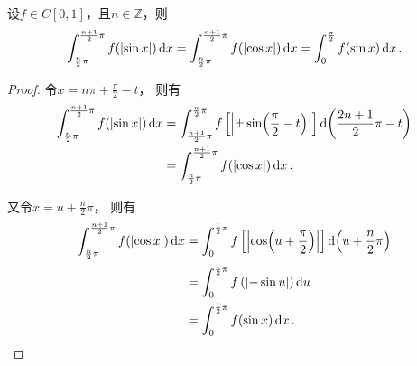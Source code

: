 \begin{proposition}\label{theorem:定积分.正余弦函数的复合的积分2}
设\(f \in C[0,1]\)，且\(n\in\mathbb{Z}\)，则\begin{equation}
	\int_{\frac{n}{2} \pi}^{\frac{n+1}{2} \pi} f(\abs{\sin x}) \dd{x}
	= \int_{\frac{n}{2} \pi}^{\frac{n+1}{2} \pi} f(\abs{\cos x}) \dd{x}
	= \int_0^{\frac{\pi}{2}} f(\sin x) \dd{x}.
\end{equation}
\def\arraystretch{1.5}
\begin{proof}
令\(x = n\pi+\frac{\pi}{2}-t\)，
则有\begin{align*}
	\int_{\frac{n}{2} \pi}^{\frac{n+1}{2} \pi} f(\abs{\sin x}) \dd{x}
	&= \int_{\frac{n+1}{2} \pi}^{\frac{n}{2} \pi} f\left[\abs{\pm\sin(\frac{\pi}{2}-t)}\right] \dd(\frac{2n+1}{2}\pi-t) \\
	&= \int_{\frac{n}{2} \pi}^{\frac{n+1}{2} \pi} f(\abs{\cos x}) \dd{x}.
\end{align*}

又令\(x=u+\frac{n}{2} \pi\)，
则有\begin{align*}
	\int_{\frac{n}{2} \pi}^{\frac{n+1}{2} \pi} f(\abs{\cos x}) \dd{x}
	&= \int_0^{\frac{1}{2}\pi} f\left[ \abs{\cos(u+\frac{\pi}{2})} \right] \dd(u+\frac{n}{2}\pi) \\
	&= \int_0^{\frac{1}{2}\pi} f\left( \abs{-\sin u} \right) \dd{u} \\
	&= \int_0^{\frac{1}{2}\pi} f(\sin x) \dd{x}.
	\qedhere
\end{align*}
\end{proof}
\end{proposition}


